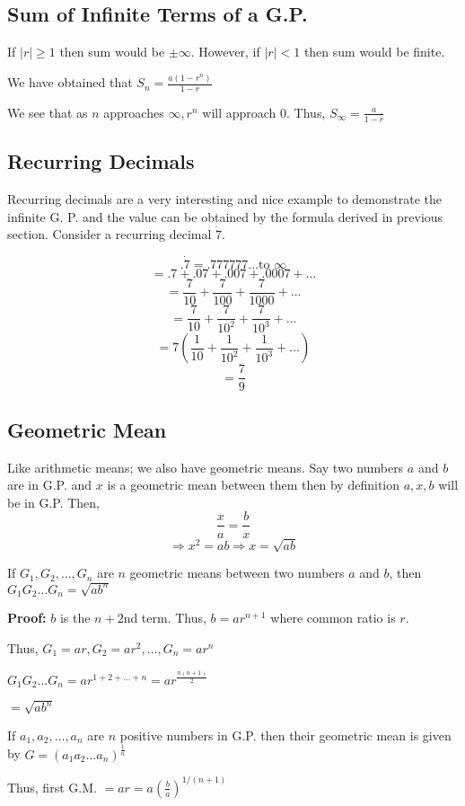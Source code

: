 \subsection{Sum of Infinite Terms of a G.P.}
If $|r|\geq 1$ then sum would be $\pm\infty$. However, if $|r|< 1$ then sum would be finite.

We have obtained that $S_n = \frac{a(1 - r^n)}{1 - r}$

We see that as $n$ approaches $\infty, r^n$ will approach $0$. Thus, $S_\infty = \frac{a}{1 - r}$

\subsection{Recurring Decimals}
Recurring decimals are a very interesting and nice example to demonstrate the infinite G. P. and the value can be obtained by the
formula derived in previous section. Consider a recurring decimal $\dot{7}$.

$$.\dot{7} = .777777 ... \text{to }\infty$$
$$= .7 + .07 + .007 + .0007 + \ldots$$
$$= \frac{7}{10} + \frac{7}{100} + \frac{7}{1000} + \ldots$$
$$= \frac{7}{10} + \frac{7}{10^2} + \frac{7}{10^3} + \ldots$$
$$= 7\left(\frac{1}{10} + \frac{1}{10^2} + \frac{1}{10^3} + \ldots\right)$$
$$= \frac{7}{9}$$

\subsection{Geometric Mean}
Like arithmetic means; we also have geometric means. Say two numbers $a$ and $b$ are in G.P. and $x$ is a geometric mean between
them then by definition $a, x, b$ will be in G.P. Then,
$$\frac{x}{a} = \frac{b}{x}$$
$$\Rightarrow x^2 = ab \Rightarrow x = \sqrt{ab}$$

If $G_1, G_2, \ldots, G_n$ are $n$ geometric means between two numbers $a$ and $b$, then $G_1G_2\ldots G_n = \sqrt{ab^n}$

\noindent\textbf{Proof:} $b$ is the $n + 2$nd term. Thus, $b = ar^{n + 1}$ where common ratio is $r$.

Thus, $G_1 = ar, G_2 = ar^2, \ldots, G_n = ar^n$

$G_1G_2\ldots G_n = ar^{1 + 2 + \ldots + n} = ar^{\frac{n(n + 1)}{2}}$

$= \sqrt{ab^n}$

If $a_1, a_2, \ldots, a_n$ are $n$ positive numbers in G.P. then their geometric mean is given by $G = (a_1a_2\ldots
a_n)^{\frac{1}{n}}$

Thus, first G.M. $= ar = a\left(\frac{b}{a}\right)^{1/(n + 1)}$


